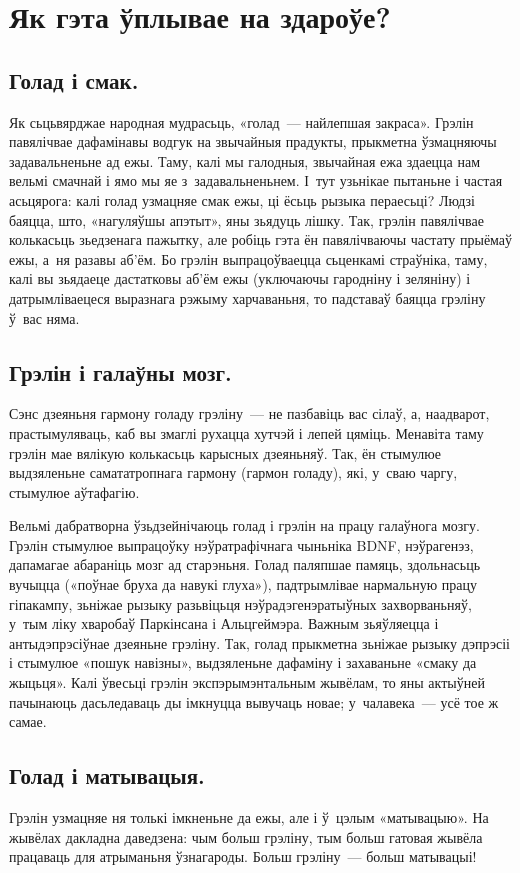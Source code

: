 \section{Як гэта ўплывае на здароўе?}

\subsection{Голад і смак.}
Як сьцьвярджае народная мудрасьць, «голад~--- найлепшая закраса». Грэлін павялічвае дафамінавы водгук на звычайныя прадукты, прыкметна ўзмацняючы задавальненьне ад ежы. Таму, калі мы галодныя, звычайная ежа здаецца нам вельмі смачнай і ямо мы яе з~задавальненьнем. І~тут узьнікае пытаньне і частая асьцярога: калі голад узмацняе смак ежы, ці ёсьць рызыка пераесьці? Людзі баяцца, што, «нагуляўшы апэтыт», яны зьядуць лішку. Так, грэлін павялічвае колькасьць зьедзенага пажытку, але робіць гэта ён павялічваючы частату прыёмаў ежы, а~ня разавы аб'ём. Бо грэлін выпрацоўваецца сьценкамі страўніка, таму, калі вы зьядаеце дастатковы аб'ём ежы (уключаючы гародніну і зеляніну) і датрымліваецеся выразнага рэжыму харчаваньня, то падставаў баяцца грэліну ў~вас няма.

\subsection{Грэлін і галаўны мозг.}
Сэнс дзеяньня гармону голаду грэліну~--- не пазбавіць вас сілаў, а, наадварот, прастымуляваць, каб вы змаглі рухацца хутчэй і лепей цяміць. Менавіта таму грэлін мае вялікую колькасьць карысных дзеяньняў. Так, ён стымулюе выдзяленьне самататропнага гармону (гармон голаду), які, у~сваю чаргу, стымулюе аўтафагію.

Вельмі дабратворна ўзьдзейнічаюць голад і грэлін на працу галаўнога мозгу. Грэлін стымулюе выпрацоўку нэўратрафічнага чыньніка BDNF, нэўрагенэз, дапамагае абараніць мозг ад старэньня. Голад паляпшае памяць, здольнасьць вучыцца («поўнае бруха да навукі глуха»), падтрымлівае нармальную працу гіпакампу, зьніжае рызыку разьвіцьця нэўрадэгенэратыўных захворваньняў, у~тым ліку хваробаў Паркінсана і Альцгеймэра. Важным зьяўляецца і антыдэпрэсіўнае дзеяньне грэліну. Так, голад прыкметна зьніжае рызыку дэпрэсіі і стымулюе «пошук навізны», выдзяленьне дафаміну і захаваньне «смаку да жыцьця». Калі ўвесьці грэлін экспэрымэнтальным жывёлам, то яны актыўней пачынаюць дасьледаваць ды імкнуцца вывучаць новае; у~чалавека~--- усё тое ж самае.

\subsection{Голад і матывацыя.}
Грэлін узмацняе ня толькі імкненьне да ежы, але і ў~цэлым «матывацыю». На жывёлах дакладна даведзена: чым больш грэліну, тым больш гатовая жывёла працаваць для атрыманьня ўзнагароды. Больш грэліну~--- больш матывацыі!

